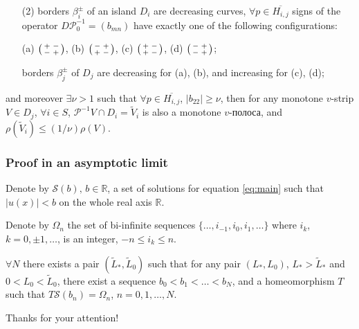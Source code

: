 \documentclass [10pt] {beamer}
\newenvironment{psm}
	{\left( \begin{smallmatrix}}
	{\end{smallmatrix} \right) }
\begin{document}
\begin{frame}
\begin{theorem}
\begin{enumerate}
			\item[(2)] borders $\beta_i^{\pm}$ of an island $D_i$ are decreasing curves, $\forall p \in \overline{H_{i,j}}$ signs of the operator $D \mathcal{P}_0^{-1} = (b_{mn})$ have exactly one of the following configurations:
				\begin{center}
					(a) $\begin{psm} + & - \\ - & + \end{psm}$, \quad
					(b) $\begin{psm} - & + \\ + & - \end{psm}$, \quad
					(c) $\begin{psm} + & - \\ + & - \end{psm}$, \quad
					(d) $\begin{psm} - & + \\ - & + \end{psm}$;
				\end{center}
				borders $\beta_j^{\pm}$ of $D_j$ are decreasing for (a), (b), and increasing for (c), (d);
		\end{enumerate}
		and moreover $\exists \nu > 1$ such that $\forall p \in \overline{H_{i,j}}$, $|b_{22}| \ge \nu$, then for any monotone $v$-strip $V \in D_j$, $\forall i \in S$, $\mathcal{P}^{-1} V \cap D_i = \widetilde{V}_i$ is also a monotone $v$-полоса, and $\rho(\widetilde{V}_i) \le (1 / \nu) \rho(V)$.
\end{theorem}
\end{frame}

\begin{frame}
	\frametitle{Proof in an asymptotic limit}
	Denote by $\mathcal{S}(b), \, b \in \mathbb{R}$, a set of solutions for equation \eqref{eq:main} such that $|u(x)| < b$ on the whole real axis $\mathbb{R}$.
	
	\vspace{10pt}
	
	Denote by $\Omega_n$ the set of bi-infinite sequences $\{\ldots,i_{-1},i_0,i_1,\ldots\}$ where $i_k$, $k=0,\pm1,\ldots$, is an integer, $-n\leq i_k\leq n$.
	
	\begin{theorem}
		$\forall N$ there exists a pair $(\widetilde{L}_*, \widetilde{L}_0)$ such that for any pair $(L_*, L_0)$, $L_* > \widetilde{L}_*$ and $0 < L_0 < \widetilde{L}_0$, there exist a sequence $b_0 < b_1 < \ldots < b_N$, and a homeomorphism $T$ such that $T \mathcal{S}(b_n) = \Omega_n$, $n = 0, 1, \ldots, N$.
		\end{theorem}
\end{frame}

\begin{frame}
	\begin{center}
		{\huge Thanks for your attention!}
	\end{center}
\end{frame}
\end{document}
